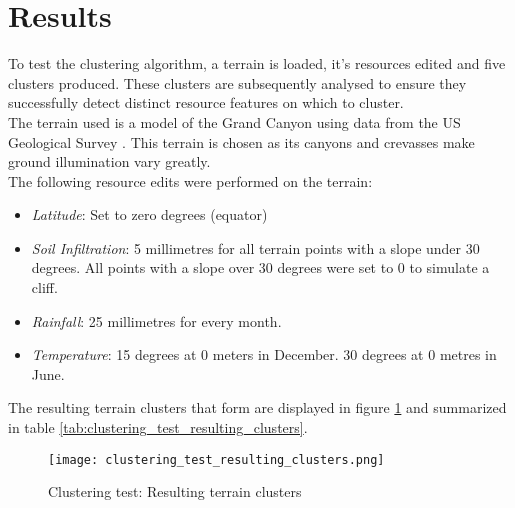 \section{Results}

To test the clustering algorithm, a terrain is loaded, it's resources edited and five clusters produced. These clusters are subsequently analysed to ensure they successfully detect distinct resource features on which to cluster.\\

The terrain used is a model of the Grand Canyon using data from the US Geological Survey \protect\footnotemark {}. This terrain is chosen as its canyons and crevasses make ground illumination vary greatly.\\

The following resource edits were performed on the terrain:

\begin{itemize}
\item \textit{Latitude}: Set to zero degrees (equator)
\item \textit{Soil Infiltration}: 5 millimetres for all terrain points with a slope under 30 degrees. All points with a slope over 30 degrees were set to 0 to simulate a cliff.
\item \textit{Rainfall}: 25 millimetres for every month.
\item \textit{Temperature}: 15 degrees at 0 meters in December. 30 degrees at 0 metres in June. 
\end{itemize}

The resulting terrain clusters that form are displayed in figure \ref{fig:clustering_test_resulting_clusters} and summarized in table \ref{tab:clustering_test_resulting_clusters}.

\begin{figure}
\center
	\texttt{[image: clustering\_test\_resulting\_clusters.png]}
	\caption{ Clustering test: Resulting terrain clusters}	
	\label{fig:clustering_test_resulting_clusters}
\end{figure}


